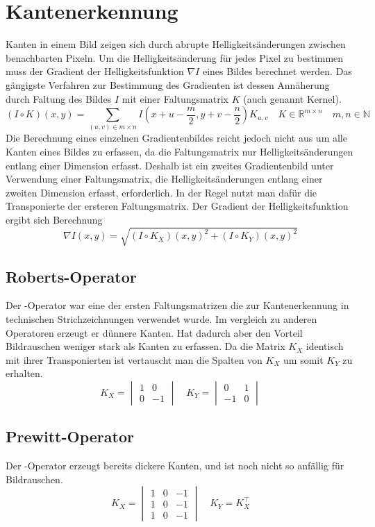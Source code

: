 \section{Kantenerkennung}
\writtenby{\dcauthornameewie}%
Kanten in einem Bild zeigen sich durch abrupte Helligkeitsänderungen zwischen benachbarten Pixeln.
Um die Helligkeitsänderung für jedes Pixel zu bestimmen muss der Gradient der Helligkeitsfunktion $\nabla I$ eines Bildes berechnet werden.
Das gängigste Verfahren zur Bestimmung des Gradienten ist dessen Annäherung durch Faltung des Bildes $I$ mit einer Faltungsmatrix $K$ (auch genannt Kernel).
  \[ (I\circ K)(x,y) =
       \sum_{(u,v)\in m\times n}
       I\left(x+u-\frac{m}{2},y+v-\frac{n}{2}\right)K_{u,v}
       \quad K\in\mathbb{R}^{m\times n}
       \quad m,n \in\mathbb{N} \]
Die Berechnung eines einzelnen Gradientenbildes reicht jedoch nicht aus um alle Kanten eines Bildes zu erfassen, da die Faltungsmatrix nur Helligkeitsänderungen entlang einer Dimension erfasst.
Deshalb ist ein zweites Gradientenbild unter Verwendung einer Faltungsmatrix, die Helligkeitsänderungen entlang einer zweiten Dimension erfasst, erforderlich.
In der Regel nutzt man dafür die Transponierte der ersteren Faltungsmatrix.
Der Gradient der Helligkeitsfunktion ergibt sich  Berechnung 
  \[ \nabla I(x,y) = \sqrt{(I \circ K_X)(x,y)^2 + (I \circ K_Y)(x,y)^2} \]

\subsection*{Roberts-Operator}
Der -Operator \cite{DBLP:books/garland/Roberts63} war eine der ersten Faltungsmatrizen die zur Kantenerkennung in technischen Strichzeichnungen verwendet wurde.
Im vergleich zu anderen Operatoren erzeugt er dünnere Kanten.
Hat dadurch aber den Vorteil Bildrauschen weniger stark als Kanten zu erfassen.
Da die Matrix $K_X$ identisch mit ihrer Transponierten ist vertauscht man die Spalten von $K_X$ um somit $K_Y$ zu erhalten.
  \[ K_X = \begin{vmatrix}
       1 &  0 \\
       0 & -1
     \end{vmatrix}
     \quad K_Y = \begin{vmatrix}
        0 & 1 \\
       -1 & 0
     \end{vmatrix} \]

\subsection*{Prewitt-Operator}
Der -Operator \cite[S.~108]{prewitt1070} erzeugt bereits dickere Kanten, und ist noch nicht so anfällig für Bildrauschen.
  \[ K_X = \begin{vmatrix}
       1 & 0 & -1 \\
       1 & 0 & -1 \\
       1 & 0 & -1
     \end{vmatrix}
     \quad K_Y = K_X^\top \]

